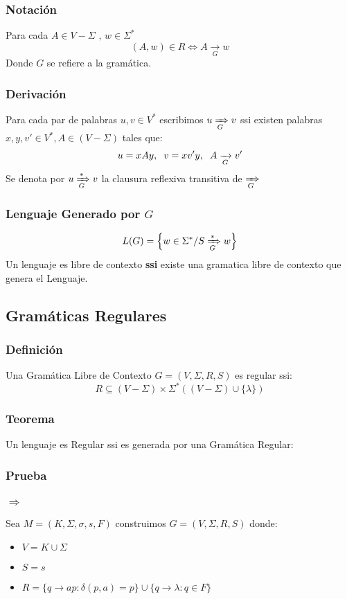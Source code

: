 \subsubsection{Notación}
Para cada $A\in V-\Sigma \text{ , } w\in\Sigma^*$
$$
(A,w)\in R \Leftrightarrow A \xrightarrow[G]{} w
$$
Donde $G$ se refiere a la gramática.
\subsubsection{Derivación}
Para cada par de palabras $u,v \in V^*$ escribimos $u \xRightarrow[G]{} v$ ssi existen palabras $x,y,v' \in V^*,A\in(V-\Sigma)$ tales que:
$$
u = xAy ,\hspace{0.2cm} v = xv' y ,\hspace{0.2cm} A \xrightarrow[G]{} v'
$$
Se denota por $u \xRightarrow[G]{*} v$ la clausura reflexiva transitiva de $\xRightarrow[G]{}$
\subsubsection{Lenguaje Generado por $G$}
$$
L(G) = \Big\{ w\in \Sigma^* / S \xRightarrow[G]{*} w \Big\} 
$$
Un lenguaje es libre de contexto \textbf{ssi} existe una gramatica libre de contexto que genera el Lenguaje.
\subsection{Gramáticas Regulares}
\subsubsection{Definición}
Una Gramática Libre de Contexto $G=(V,\Sigma,R,S)$ es regular ssi:
$$
R \subseteq (V-\Sigma)\times \Sigma^*((V-\Sigma)\cup \{ \lambda \} )
$$
\subsubsection{Teorema}
Un lenguaje es Regular ssi es generada por una Gramática Regular:
\subsubsection*{Prueba}
\subsubsection*{ $\Rightarrow$}
Sea $M=(K,\Sigma,\sigma,s,F)$ construimos $G=(V,\Sigma , R,S)$ donde:
\begin{itemize}
\item $V= K \cup \Sigma$
\item $S = s$
\item $R = \{ q \rightarrow ap : \delta(p,a)=p \} \cup \{ q \rightarrow \lambda : q\in F \}$
\end{itemize}
